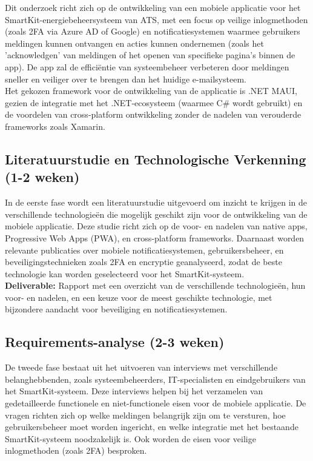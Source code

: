 \noindent Dit onderzoek richt zich op de ontwikkeling van een mobiele applicatie voor het SmartKit-energiebeheersysteem van ATS, met een focus op veilige inlogmethoden (zoals 2FA via Azure AD of Google) en notificatiesystemen waarmee gebruikers meldingen kunnen ontvangen en acties kunnen ondernemen (zoals het 'acknowledgen' van meldingen of het openen van specifieke pagina's binnen de app). De app zal de efficiëntie van systeembeheer verbeteren door meldingen sneller en veiliger over te brengen dan het huidige e-mailsysteem. \\

\noindent Het gekozen framework voor de ontwikkeling van de applicatie is .NET MAUI, gezien de integratie met het .NET-ecosysteem (waarmee C# wordt gebruikt) en de voordelen van cross-platform ontwikkeling zonder de nadelen van verouderde frameworks zoals Xamarin.

\subsection{Literatuurstudie en Technologische Verkenning (1-2 weken)}
\noindent In de eerste fase wordt een literatuurstudie uitgevoerd om inzicht te krijgen in de verschillende technologieën die mogelijk geschikt zijn voor de ontwikkeling van de mobiele applicatie. Deze studie richt zich op de voor- en nadelen van native apps, Progressive Web Apps (PWA), en cross-platform frameworks. Daarnaast worden relevante publicaties over mobiele notificatiesystemen, gebruikersbeheer, en beveiligingstechnieken zoals 2FA en encryptie geanalyseerd, zodat de beste technologie kan worden geselecteerd voor het SmartKit-systeem. \\

\noindent \textbf{Deliverable:} Rapport met een overzicht van de verschillende technologieën, hun voor- en nadelen, en een keuze voor de meest geschikte technologie, met bijzondere aandacht voor beveiliging en notificatiesystemen.

\subsection{Requirements-analyse (2-3 weken)}
\noindent De tweede fase bestaat uit het uitvoeren van interviews met verschillende belanghebbenden, zoals systeembeheerders, IT-specialisten en eindgebruikers van het SmartKit-systeem. Deze interviews helpen bij het verzamelen van gedetailleerde functionele en niet-functionele eisen voor de mobiele applicatie. De vragen richten zich op welke meldingen belangrijk zijn om te versturen, hoe gebruikersbeheer moet worden ingericht, en welke integratie met het bestaande SmartKit-systeem noodzakelijk is. Ook worden de eisen voor veilige inlogmethoden (zoals 2FA) besproken. \\

